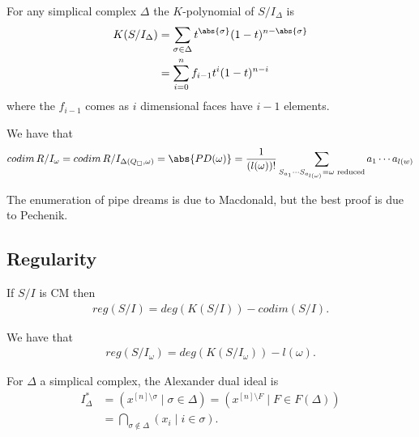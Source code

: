 \begin{theorem}
    For any simplical complex $\Delta$ the $K$-polynomial of $S / I_\Delta $ is 
    \begin{align*}
        K(S / I_\Delta ) &= \sum_{\sigma \in \Delta } t^{\abs{\sigma } } (1-t)^{n - \abs{\sigma}}\\
        &= \sum_{i=0 }^n f_{i-1} t^i (1-t)^{n-i}
    \end{align*}
    where the $f_{i-1}$ comes as $i$ dimensional faces have $i-1$ elements.
\end{theorem}

\begin{corollary}
We have that
    \begin{align*}
        codim \,R / I_\omega  = codim \, R/ I_{\Delta (Q_\square , \omega) } = \abs{ PD(\omega)} = \frac{1}{(l(\omega ))!} \sum_{S_{a_{1}} \cdots S_{a_{l(\omega)} } = \omega \text{ reduced} } a_1 \cdots a_{l(w)} 
    \end{align*}
\end{corollary}

The enumeration of pipe dreams is due to Macdonald, but the best proof is due to Pechenik.

\subsection{Regularity}

\begin{theorem}
    If $S/ I$ is CM then
    \begin{align*}
        reg (S/I ) = deg (K( S/I) ) - codim (S/I).
    \end{align*}
\end{theorem}

\begin{corollary}
    We have that
    \begin{align*}
        reg (S/I_\omega) = deg( K(S/I_\omega) ) - l(\omega).
    \end{align*}
\end{corollary}

\begin{definition}
    For $\Delta $ a simplical complex, the Alexander dual ideal is 
    \begin{align*}
        I_\Delta^* &= ( x^{[n] \setminus \sigma } \mid \sigma \in \Delta  ) = ( x^{[n] \setminus F } \mid F \in F(\Delta ) )\\
        &= \bigcap_{\sigma \notin \Delta } (x_i \mid i \in \sigma).
    \end{align*} 
\end{definition}


